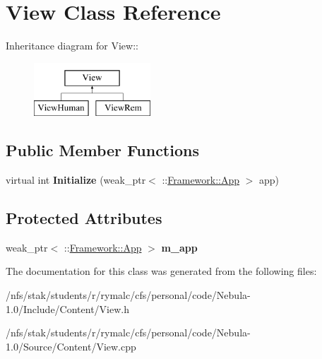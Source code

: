 \hypertarget{classView}{
\section{View Class Reference}
\label{classView}
}
Inheritance diagram for View::\begin{figure}[H]
\begin{center}
\leavevmode
\includegraphics[height=2cm]{classView}
\end{center}
\end{figure}
\subsection*{Public Member Functions}
\begin{DoxyCompactItemize}
\item 
\hypertarget{classView_ae4123b61a6a2e3906b2ce5868d555702}{
virtual int {\bfseries Initialize} (weak\_\-ptr$<$ ::\hyperlink{classFramework_1_1App}{Framework::App} $>$ app)}
\label{classView_ae4123b61a6a2e3906b2ce5868d555702}

\end{DoxyCompactItemize}
\subsection*{Protected Attributes}
\begin{DoxyCompactItemize}
\item 
\hypertarget{classView_a9ea88163773e142df2631093eac87e5c}{
weak\_\-ptr$<$ ::\hyperlink{classFramework_1_1App}{Framework::App} $>$ {\bfseries m\_\-app}}
\label{classView_a9ea88163773e142df2631093eac87e5c}

\end{DoxyCompactItemize}


The documentation for this class was generated from the following files:\begin{DoxyCompactItemize}
\item 
/nfs/stak/students/r/rymalc/cfs/personal/code/Nebula-\/1.0/Include/Content/View.h\item 
/nfs/stak/students/r/rymalc/cfs/personal/code/Nebula-\/1.0/Source/Content/View.cpp\end{DoxyCompactItemize}
